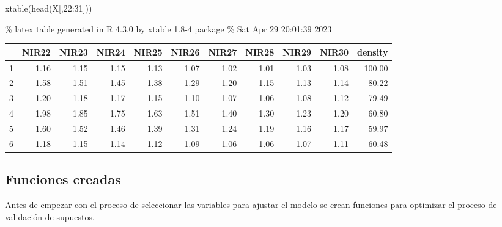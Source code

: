 \documentclass[
]{article}
\newenvironment{Shaded}{\begin{snugshade}}{\end{snugshade}}
\newcommand{\DecValTok}[1]{\textcolor[rgb]{0.00,0.00,0.81}{#1}}
\newcommand{\FunctionTok}[1]{\textcolor[rgb]{0.00,0.00,0.00}{#1}}
\newcommand{\NormalTok}[1]{#1}
\newcommand{\SpecialCharTok}[1]{\textcolor[rgb]{0.00,0.00,0.00}{#1}}
\begin{document}
\begin{Shaded}
\begin{Highlighting}[]
\FunctionTok{xtable}\NormalTok{(}\FunctionTok{head}\NormalTok{(X[,}\DecValTok{22}\SpecialCharTok{:}\DecValTok{31}\NormalTok{]))}
\end{Highlighting}
\end{Shaded}

\% latex table generated in R 4.3.0 by xtable 1.8-4 package \% Sat Apr
29 20:01:39 2023

\begin{table}[ht]
\centering
\begin{tabular}{rrrrrrrrrrr}
  \hline
 & NIR22 & NIR23 & NIR24 & NIR25 & NIR26 & NIR27 & NIR28 & NIR29 & NIR30 & density \\ 
  \hline
1 & 1.16 & 1.15 & 1.15 & 1.13 & 1.07 & 1.02 & 1.01 & 1.03 & 1.08 & 100.00 \\ 
  2 & 1.58 & 1.51 & 1.45 & 1.38 & 1.29 & 1.20 & 1.15 & 1.13 & 1.14 & 80.22 \\ 
  3 & 1.20 & 1.18 & 1.17 & 1.15 & 1.10 & 1.07 & 1.06 & 1.08 & 1.12 & 79.49 \\ 
  4 & 1.98 & 1.85 & 1.75 & 1.63 & 1.51 & 1.40 & 1.30 & 1.23 & 1.20 & 60.80 \\ 
  5 & 1.60 & 1.52 & 1.46 & 1.39 & 1.31 & 1.24 & 1.19 & 1.16 & 1.17 & 59.97 \\ 
  6 & 1.18 & 1.15 & 1.14 & 1.12 & 1.09 & 1.06 & 1.06 & 1.07 & 1.11 & 60.48 \\ 
   \hline
\end{tabular}
\end{table}

\hypertarget{funciones-creadas}{%
\subsection{Funciones creadas}\label{funciones-creadas}}

Antes de empezar con el proceso de seleccionar las variables para
ajustar el modelo se crean funciones para optimizar el proceso de
validación de supuestos.
\end{document}

